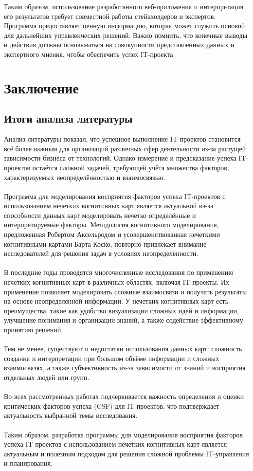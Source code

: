 \documentclass{article}
\begin{document}
    Таким образом, использование разработанного веб-приложения и интерпретация его результатов требует совместной работы стейкхолдеров и экспертов. Программа предоставляет ценную информацию, которая может служить основой для дальнейших управленческих решений. Важно помнить, что конечные выводы и действия должны основываться на совокупности представленных данных и экспертного мнения, чтобы обеспечить успех IT-проекта.
    \newpage
    \section{Заключение}
    \subsection{Итоги анализа литературы}
    Анализ литературы показал, что успешное выполнение IT-проектов становится всё более важным для организаций различных сфер деятельности из-за растущей зависимости бизнеса от технологий. Однако измерение и предсказание успеха IT-проектов остаётся сложной задачей, требующей учёта множества факторов, характеризуемых неопределённостью и взаимосвязью.\\
    ~\\
    Программа для моделирования восприятия факторов успеха IT-проектов с использованием нечетких когнитивных карт является актуальной из-за способности данных карт моделировать нечетко определённые и интерпретируемые факторы. Методология когнитивного моделирования, предложенная Робертом Аксельродом и усовершенствованная нечеткими когнитивными картами Барта Коско, повторно привлекает внимание исследователей для решения задач в условиях неопределённости.\\
    ~\\
    В последние годы проводятся многочисленные исследования по применению нечетких когнитивных карт в различных областях, включая IT-проекты. Их применение позволяет моделировать сложные взаимосвязи и получать результаты на основе неопределённой информации. У нечетких когнитивных карт есть преимущества, такие как удобство визуализации сложных идей и информации, улучшение понимания и организации знаний, а также содействие эффективному принятию решений.\\
    ~\\
    Тем не менее, существуют и недостатки использования данных карт: сложность создания и интерпретации при большом объёме информации и сложных взаимосвязях, а также субъективность из-за зависимости от знаний и восприятия отдельных людей или групп.\\
    ~\\
    Во всех рассмотренных работах подчеркивается важность определения и оценки критических факторов успеха (CSF) для IT-проектов, что подтверждает актуальность выбранной темы исследования.\\
    ~\\
    Таким образом, разработка программы для моделирования восприятия факторов успеха IT-проектов с использованием нечетких когнитивных карт является актуальным и полезным подходом для решения сложной проблемы IT-управления и планирования.\\
\end{document}
